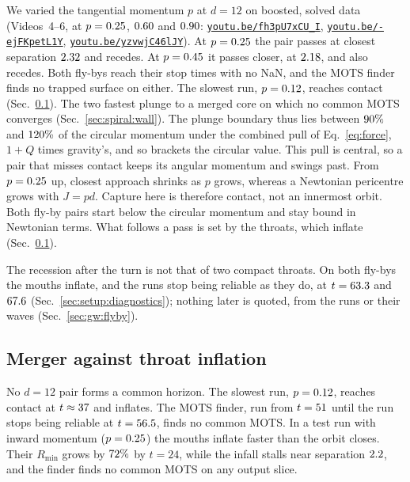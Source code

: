 \documentclass[twocolumn,floatfix,aps,prd,superscriptaddress,nofootinbib]{revtex4-2}
\begin{document}
We varied the tangential momentum $p$ at $d=12$ on boosted, solved data (Videos~4--6, at $p=0.25$, $0.60$ and $0.90$: \href{https://youtu.be/fh3pU7xCU_I}{\nolinkurl{youtu.be/fh3pU7xCU_I}}, \href{https://youtu.be/-ejFKpetL1Y}{\nolinkurl{youtu.be/-ejFKpetL1Y}}, \href{https://youtu.be/yzvwjC46lJY}{\nolinkurl{youtu.be/yzvwjC46lJY}}). At $p=0.25$ the pair passes at closest separation $2.32$ and recedes. At $p=0.45$ it passes closer, at $2.18$, and also recedes. Both fly-bys reach their stop times with no NaN, and the MOTS finder finds no trapped surface on either. The slowest run, $p=0.12$, reaches contact (Sec.~\ref{sec:spiral:race}). The two fastest plunge to a merged core on which no common MOTS converges (Sec.~\ref{sec:spiral:wall}). The plunge boundary thus lies between $90\%$ and $120\%$ of the circular momentum under the combined pull of Eq.~\eqref{eq:force}, $1+Q$ times gravity's, and so brackets the circular value. This pull is central, so a pair that misses contact keeps its angular momentum and swings past. From $p=0.25$ up, closest approach shrinks as $p$ grows, whereas a Newtonian pericentre grows with $J=pd$. Capture here is therefore contact, not an innermost orbit. Both fly-by pairs start below the circular momentum and stay bound in Newtonian terms. What follows a pass is set by the throats, which inflate (Sec.~\ref{sec:spiral:race}).

The recession after the turn is not that of two compact throats. On both fly-bys the mouths inflate, and the runs stop being reliable as they do, at $t=63.3$ and $67.6$ (Sec.~\ref{sec:setup:diagnostics}); nothing later is quoted, from the runs or their waves (Sec.~\ref{sec:gw:flyby}).

\subsection{Merger against throat inflation}
\label{sec:spiral:race}

No $d=12$ pair forms a common horizon. The slowest run, $p=0.12$, reaches contact at $t\approx37$ and inflates. The MOTS finder, run from $t=51$ until the run stops being reliable at $t=56.5$, finds no common MOTS. In a test run with inward momentum ($p=0.25$) the mouths inflate faster than the orbit closes. Their $R_{\min}$ grows by $72\%$ by $t=24$, while the infall stalls near separation $2.2$, and the finder finds no common MOTS on any output slice.
\end{document}
